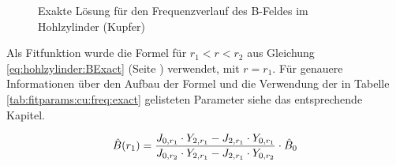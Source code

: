\begin{figure}[h!]
    \resizebox{\textwidth}{!}{}
    \caption{Exakte L\"osung f\"ur den Frequenzverlauf des B-Feldes im Hohlzylinder (Kupfer)}
    \label{fig:cu:freq:exact}
\end{figure}

\begin{minipage}[t][][t]{0.43\textwidth}
    
\end{minipage}
\begin{minipage}[t][][t]{0.56\textwidth}

    Als  Fitfunktion   wurde  die  Formel  f\"ur   $r_1<r<r_2$  aus  Gleichung
    \ref{eq:hohlzylinder:BExact}    (Seite   \pageref{eq:hohlzylinder:BExact})
    verwendet,   mit   $r   =  r_1$. F\"ur   genauere   Informationen   \"uber
    den   Aufbau   der   Formel   und    die   Verwendung   der   in   Tabelle
    \ref{tab:fitparams:cu:freq:exact}    gelisteten   Parameter    siehe   das
    entsprechende Kapitel.

    \begin{equation*}
        \hat{B} (r_1) = \frac{J_{0,r_1} \cdot Y_{2,r_1} - J_{2,r_1} \cdot Y_{0,r_1}}{J_{0,r_2} \cdot Y_{2,r_1} - J_{2,r_1} \cdot Y_{0,r_2}} \cdot \hat{B}_0 \\
    \end{equation*}
\end{minipage}

%        
\clearpage
